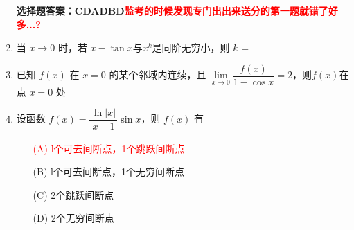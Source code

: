 \documentclass[a4paper,12pt]{article}
\begin{document}
\begin{enumerate}
    \item[]\textbf{选择题答案：CDADBD\textcolor{red}{监考的时候发现专门出出来送分的第一题就错了好多...?}} 

    \item 当 \( x \to 0 \) 时，若 \( x - \tan x \)与\( x^k \)是同阶无穷小，则 \( k \) = 
    \begin{multicols}{4}
    \end{multicols}
    

    \item 已知 \( f(x) \) 在 \( x=0 \) 的某个邻域内连续，且 \( \underset{x \to 0}{\lim} \dfrac{f(x)}{1 - \cos x} = 2 \)，则\( f(x) \)在点 \( x=0 \) 处
    \begin{multicols}{2}
    \end{multicols}

    \item 设函数 \( f(x) = \dfrac{\ln \left| x \right| }{\left| x - 1 \right|}\sin x \)，则 \( f(x) \) 有
    \begin{multicols}{2}
        \begin{itemize}
            \item[\textcolor{red}{(A)}] \textcolor{red}{l个可去间断点，1个跳跃间断点}
            \item[(B)] l个可去间断点，1个无穷间断点
            \item[(C)] 2个跳跃间断点
            \item[(D)] 2个无穷间断点
        \end{itemize}
    \end{multicols}


\end{enumerate}
\end{document}
